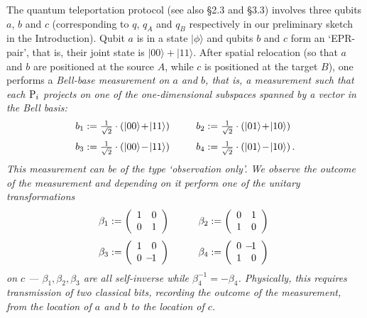 \documentclass[10pt]{article}
\begin{document}
The quantum teleportation protocol \cite{BBC} (see also \cite{Coe1} \S 2.3
and
\S 3.3) involves three qubits $a$, $b$ and $c$ (corresponding to $q$,
$q_A$ and $q_B$ respectively in our preliminary sketch in the Introduction). Qubit $a$ is in a state $|\phi\rangle$
and qubits $b$ and $c$ form an `EPR-pair', that is, their joint state is $|00\rangle+|11\rangle$. 
After spatial relocation (so that $a$ and $b$ are positioned at the
source $A$, while $c$ is positioned at the target $B$), one performs a \em Bell-base measurement
\em on $a$ and $b$, that is, a measurement such that each ${\rm P}_i$ projects on one of the
one-dimensional subspaces spanned by a vector in the \em
Bell basis\em: 
\[
\begin{array}{lcl}
b_1:={1\over \sqrt{2}}\cdot(|00\rangle\!+\!|11\rangle)&\ \ &
b_2:={1\over \sqrt{2}}\cdot(|01\rangle\!+\!|10\rangle)\vspace{2.5mm}\\ 
b_3:={1\over \sqrt{2}}\cdot(|00\rangle\!-\!|11\rangle)&\ \ &
b_4:={1\over \sqrt{2}}\cdot(|01\rangle\!-\!|10\rangle)\,.
\end{array} 
\]
This measurement can be of the type `observation only'. We observe the outcome of the measurement and depending on it
perform one of the unitary
transformations
\[
\begin{array}{lcl}
\beta_1:=\left(\begin{array}{rr} 
1&0\\
0&1
\end{array}\right)
&\quad&
\beta_2:=\left(\begin{array}{rr}
0&1\\
1&0
\end{array}\right)
\vspace{2.5mm}\\
\beta_3:=\left(\begin{array}{rr}
1&0\\
0&\!\!\!\!\!-\!1
\end{array}\right)
&\quad&
\beta_4:=\left(\begin{array}{rr}
0&\!\!\!\!\!-\!1\\
1&0
\end{array}\right) 
\end{array}\ 
\]
on $c$ --- $\beta_1,\beta_2,\beta_3$
are all self-inverse while
$\beta_4^{-1}=-\beta_4$. Physically, this requires transmission of two
classical bits, recording the outcome of
the measurement, from the location of
$a$ and $b$ to the location of $c$.
\end{document}
